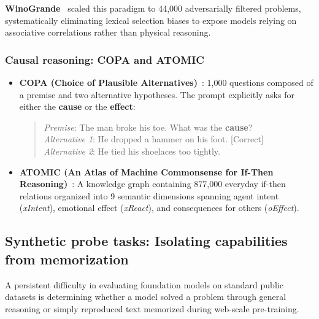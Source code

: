 \documentclass[../../main.tex]{subfiles}
\begin{document}
\textbf{WinoGrande}~\cite{sakaguchi2020winogrande} scaled this paradigm to 44,000 adversarially filtered problems, systematically eliminating lexical selection biases to expose models relying on associative correlations rather than physical reasoning.

\subsubsection{Causal reasoning: COPA and ATOMIC}
\begin{itemize}
    \item \textbf{COPA (Choice of Plausible Alternatives)}~\cite{roemmele2011copa}: 1,000 questions composed of a premise and two alternative hypotheses. The prompt explicitly asks for either the \textbf{cause} or the \textbf{effect}:
    \begin{quote}
    \textit{Premise}: The man broke his toe. What was the \textbf{cause}? \\
    \textit{Alternative 1}: He dropped a hammer on his foot. [Correct] \\
    \textit{Alternative 2}: He tied his shoelaces too tightly.
    \end{quote}
    \item \textbf{ATOMIC (An Atlas of Machine Commonsense for If-Then Reasoning)}~\cite{sap2019atomic}: A knowledge graph containing 877,000 everyday if-then relations organized into 9 semantic dimensions spanning agent intent (\textit{xIntent}), emotional effect (\textit{xReact}), and consequences for others (\textit{oEffect}).
\end{itemize}

\subsection{Synthetic probe tasks: Isolating capabilities from memorization}
\label{subsec:synthetic_probe_tasks}

A persistent difficulty in evaluating foundation models on standard public datasets is determining whether a model solved a problem through general reasoning or simply reproduced text memorized during web-scale pre-training.
\end{document}
